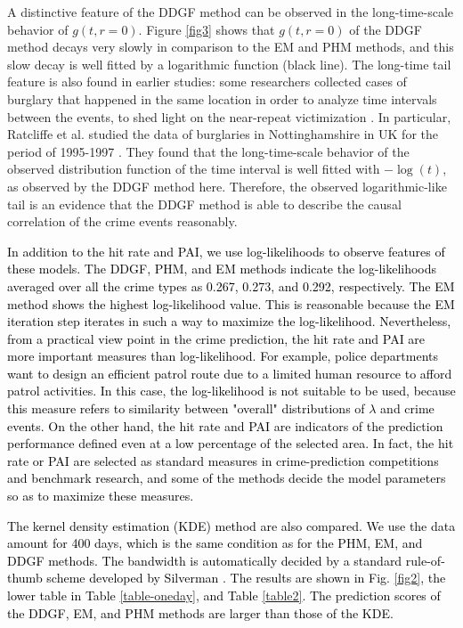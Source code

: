 \documentclass[review]{elsarticle}
\newcommand{\blue}[1]{\textcolor{black}{#1}}
\begin{document}
A distinctive feature of the DDGF method can be observed in the long-time-scale behavior of $g(t,r=0)$.
Figure  \ref{fig3} shows that $g(t,r=0)$ of the DDGF method decays very slowly in comparison to
the EM and PHM methods, and
this slow decay is well fitted by a logarithmic function (black line).
The long-time tail feature is also found in earlier studies:
some researchers collected cases of burglary that happened in the same location
in order to analyze time intervals between the events, to shed light on the near-repeat victimization \cite{anderson, burquest, ratcliffe}.
In particular, Ratcliffe et al. studied the data of burglaries  in Nottinghamshire in UK for the period of 1995-1997 \cite{ratcliffe}.
They found that the long-time-scale behavior of the observed distribution function
of the time interval is well fitted with $-\log(t)$, as observed by the DDGF method here.
Therefore, the observed logarithmic-like tail
is an evidence that the DDGF method is able to describe the causal correlation of the crime events reasonably.



\blue{
In addition to the hit rate and PAI, 
we use log-likelihoods to observe features of these models. 
The DDGF, PHM, and EM methods
indicate the log-likelihoods averaged 
over all the crime types as 0.267, 0.273, and 0.292, respectively. 
The EM method shows 
the highest log-likelihood value.
This is reasonable because the EM iteration step
iterates in such a way to maximize the log-likelihood. 
Nevertheless, from a practical view point in the crime prediction,
the hit rate and PAI are more important measures than log-likelihood.
 For example, 
 police departments want to design an efficient patrol route
 due to a limited human resource to afford patrol activities.
In this case, the log-likelihood is not suitable to be used, because
this measure refers to similarity between "overall" distributions of $\lambda$ and crime events.
On the other hand,  
the hit rate and PAI are indicators of the prediction performance
defined even at a low percentage of the selected area.
In fact, the hit rate or PAI are selected as standard measures in crime-prediction competitions and benchmark research\cite{mohler, adepeju2016,nij}, and some of the methods decide the model parameters so as to maximize these measures\cite{mohler2017}.
}


\blue{
The kernel density estimation (KDE) method are also compared.
We use the data amount for 400 days, which is the same condition as for the PHM, EM, and DDGF methods.
The bandwidth is automatically decided by a standard rule-of-thumb scheme developed by Silverman \cite{silverman}.
The results are shown in Fig. \ref{fig2}, the lower table in Table \ref{table-oneday}, and Table \ref{table2}.
The prediction scores of the DDGF, EM, and PHM methods are larger than those of the KDE.
}
\end{document}
